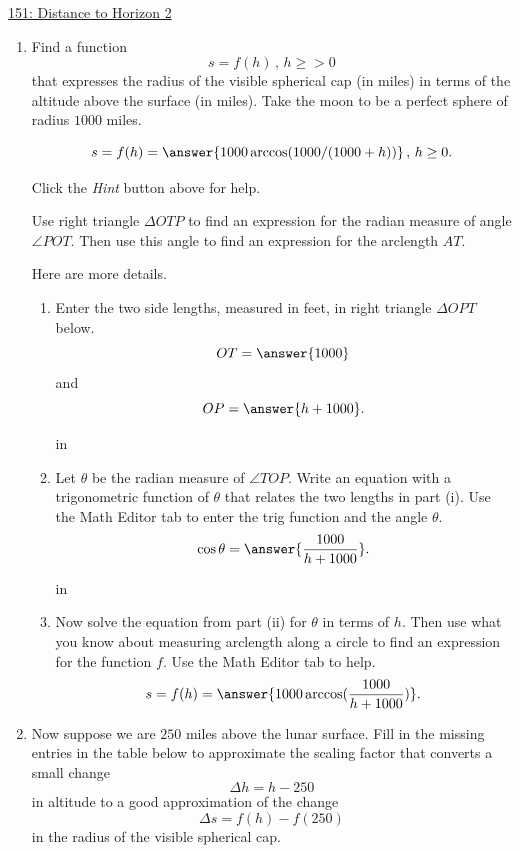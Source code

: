 \documentclass{ximera}
\newcommand{\pskip}{\vskip 0.1 in}
\begin{document}
\begin{question}
\href{https://www.desmos.com/calculator/1oj7ofkmda}{151: Distance to Horizon 2}



\begin{enumerate}

\item Find a function
\[
       s = f(h) \, , \, h \geq >0
\]
that expresses the radius of the visible spherical cap (in miles) in terms of the altitude above the surface (in miles). Take the moon to be a perfect sphere of radius $1000$ miles.

\[
     s = f(h) = \answer{1000\arccos(1000/(1000+h))} \, , \, h \geq 0.
\]

Click the \emph{Hint} button above for help.
\begin{hint}
Use right triangle $\Delta OTP$ to find an expression for the radian measure of angle $\angle POT$. Then use this angle to find an expression for the arclength $AT$.

Here are more details.

\begin{enumerate}

\item  Enter the two side lengths, measured in feet, in right triangle $\Delta OPT$ below.
\[
      OT = \answer{1000}
\]
and
\[
        OP = \answer{h+1000} .
\]

\pskip

\item Let $\theta$ be the radian measure of $\angle TOP$. Write an equation with a trigonometric function of $\theta$ that relates the two lengths in part (i). Use the Math Editor tab to enter the trig function and the angle $\theta$.
\[
     \cos \theta = \answer{\frac{1000}{h+1000}}.
\]

\pskip

\item Now solve the equation from part (ii) for $\theta$ in terms of $h$. Then use what you know about measuring arclength along a circle to find an expression for the function $f$. Use the Math Editor tab to help.
\[
      s = f(h) = \answer{1000 \arccos( \frac{1000}{h+1000})} .
\]
\end{enumerate}
\end{hint}




\item Now suppose we are $250$ miles above the lunar surface. Fill in the missing entries in the table below to approximate the scaling factor that converts a small change 
\[
  \Delta h = h - 250
\]
in altitude to a good approximation of the change
\[
  \Delta s = f(h) - f(250)
\]
in the radius of the visible spherical cap.


\end{enumerate}
\end{question}
\end{document}
